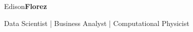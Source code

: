 \begin{center}
    {\fontsize{50}{40}\selectfont Edison\textbf{Florez}}

    \vspace*{3mm}
    \Large{
        Data Scientist | Business Analyst | Computational Physicist
    }
\end{center}
